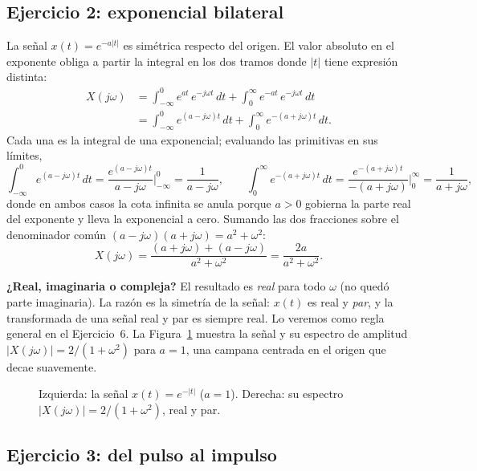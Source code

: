 \documentclass[10pt,a4paper]{article}
\begin{document}
	\subsection*{Ejercicio 2: exponencial bilateral}

	La señal $x(t)=e^{-a|t|}$ es simétrica respecto del origen. El valor absoluto en el exponente obliga a partir la integral en los dos tramos donde $|t|$ tiene expresión distinta:
	\begin{align*}
		X(j\omega)
		&= \int_{-\infty}^{0} e^{at}\,e^{-j\omega t}\,dt + \int_{0}^{\infty} e^{-at}\,e^{-j\omega t}\,dt \\
		&= \int_{-\infty}^{0} e^{(a-j\omega)t}\,dt + \int_{0}^{\infty} e^{-(a+j\omega)t}\,dt.
	\end{align*}
	Cada una es la integral de una exponencial; evaluando las primitivas en sus límites,
	\[
		\int_{-\infty}^{0} e^{(a-j\omega)t}\,dt = \frac{e^{(a-j\omega)t}}{a-j\omega}\bigg|_{-\infty}^{0}=\frac{1}{a-j\omega},
		\qquad
		\int_{0}^{\infty} e^{-(a+j\omega)t}\,dt = \frac{e^{-(a+j\omega)t}}{-(a+j\omega)}\bigg|_{0}^{\infty}=\frac{1}{a+j\omega},
	\]
	donde en ambos casos la cota infinita se anula porque $a>0$ gobierna la parte real del exponente y lleva la exponencial a cero. Sumando las dos fracciones sobre el denominador común $(a-j\omega)(a+j\omega)=a^2+\omega^2$:
	\[
		\boxed{X(j\omega) = \frac{(a+j\omega)+(a-j\omega)}{a^2+\omega^2} = \frac{2a}{a^2+\omega^2}.}
	\]

	\textbf{¿Real, imaginaria o compleja?} El resultado es \emph{real} para todo $\omega$ (no quedó parte imaginaria). La razón es la simetría de la señal: $x(t)$ es real y \emph{par}, y la transformada de una señal real y par es siempre real. Lo veremos como regla general en el Ejercicio~6. La Figura~\ref{fig:sol_ej2} muestra la señal y su espectro de amplitud $|X(j\omega)|=2/(1+\omega^2)$ para $a=1$, una campana centrada en el origen que decae suavemente.

	\begin{figure}[H]
		\centering
		
		\caption{Izquierda: la señal $x(t)=e^{-|t|}$ ($a=1$). Derecha: su espectro $|X(j\omega)|=2/(1+\omega^2)$, real y par.}
		\label{fig:sol_ej2}
	\end{figure}

	\subsection*{Ejercicio 3: del pulso al impulso}
\end{document}
